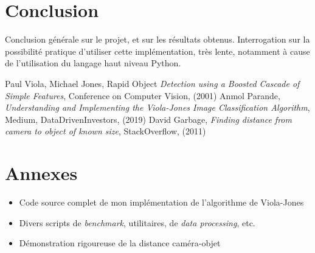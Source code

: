 \documentclass[12pt,a4paper]{article}
\begin{document}
\section{Conclusion}
Conclusion générale sur le projet, et sur les résultats obtenus. Interrogation sur la possibilité pratique d'utiliser cette implémentation, très lente, notamment à cause de l'utilisation du langage haut niveau Python.

\begin{thebibliography}{9}
    \bibitem{}Paul Viola, Michael Jones, Rapid Object \textit{Detection using a Boosted Cascade of Simple Features}, Conference on Computer Vision, (2001)
    \bibitem{}Anmol Parande, \textit{Understanding and Implementing the Viola-Jones Image Classification Algorithm}, Medium, DataDrivenInvestors, (2019)
    \bibitem{}David Garbage, \textit{Finding distance from camera to object of known size}, StackOverflow, (2011)

\end{thebibliography}

\section*{Annexes}
\begin{itemize}
    \item Code source complet de mon implémentation de l'algorithme de Viola-Jones
    \item Divers scripts de \textit{benchmark}, utilitaires, de \textit{data processing}, etc.
    \item Démonstration rigoureuse de la distance caméra-objet
\end{itemize}
\end{document}
